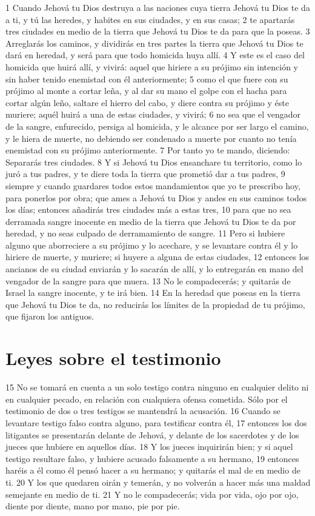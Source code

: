 1 Cuando Jehová tu Dios destruya a las naciones cuya tierra Jehová tu Dios te da a ti, y tú las heredes, y habites en sus ciudades, y en sus casas;
2 te apartarás tres ciudades en medio de la tierra que Jehová tu Dios te da para que la poseas.
3 Arreglarás los caminos, y dividirás en tres partes la tierra que Jehová tu Dios te dará en heredad, y será para que todo homicida huya allí.
4 Y este es el caso del homicida que huirá allí, y vivirá: aquel que hiriere a su prójimo sin intención y sin haber tenido enemistad con él anteriormente;
5 como el que fuere con su prójimo al monte a cortar leña, y al dar su mano el golpe con el hacha para cortar algún leño, saltare el hierro del cabo, y diere contra su prójimo y éste muriere; aquél huirá a una de estas ciudades, y vivirá;
6 no sea que el vengador de la sangre, enfurecido, persiga al homicida, y le alcance por ser largo el camino, y le hiera de muerte, no debiendo ser condenado a muerte por cuanto no tenía enemistad con su prójimo anteriormente.
7 Por tanto yo te mando, diciendo: Separarás tres ciudades.
8 Y si Jehová tu Dios ensanchare tu territorio, como lo juró a tus padres, y te diere toda la tierra que prometió dar a tus padres,
9 siempre y cuando guardares todos estos mandamientos que yo te prescribo hoy, para ponerlos por obra; que ames a Jehová tu Dios y andes en sus caminos todos los días; entonces añadirás tres ciudades más a estas tres,
10 para que no sea derramada sangre inocente en medio de la tierra que Jehová tu Dios te da por heredad, y no seas culpado de derramamiento de sangre.
11 Pero si hubiere alguno que aborreciere a su prójimo y lo acechare, y se levantare contra él y lo hiriere de muerte, y muriere; si huyere a alguna de estas ciudades,
12 entonces los ancianos de su ciudad enviarán y lo sacarán de allí, y lo entregarán en mano del vengador de la sangre para que muera.
13 No le compadecerás; y quitarás de Israel la sangre inocente, y te irá bien.
14 En la heredad que poseas en la tierra que Jehová tu Dios te da, no reducirás los límites de la propiedad de tu prójimo, que fijaron los antiguos.

\section{Leyes sobre el testimonio}

15 No se tomará en cuenta a un solo testigo contra ninguno en cualquier delito ni en cualquier pecado, en relación con cualquiera ofensa cometida. Sólo por el testimonio de dos o tres testigos se mantendrá la acusación. 
16 Cuando se levantare testigo falso contra alguno, para testificar contra él,
17 entonces los dos litigantes se presentarán delante de Jehová, y delante de los sacerdotes y de los jueces que hubiere en aquellos días.
18 Y los jueces inquirirán bien; y si aquel testigo resultare falso, y hubiere acusado falsamente a su hermano,
19 entonces haréis a él como él pensó hacer a su hermano; y quitarás el mal de en medio de ti.
20 Y los que quedaren oirán y temerán, y no volverán a hacer más una maldad semejante en medio de ti.
21 Y no le compadecerás; vida por vida, ojo por ojo, diente por diente, mano por mano, pie por pie.

